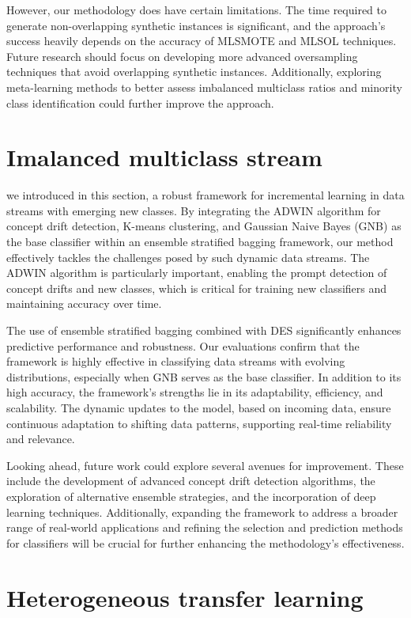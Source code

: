 However, our methodology does have certain limitations. The time required to generate non-overlapping synthetic instances is significant, and the approach's success heavily depends on the accuracy of MLSMOTE and MLSOL techniques. Future research should focus on developing more advanced oversampling techniques that avoid overlapping synthetic instances. Additionally, exploring meta-learning methods to better assess imbalanced multiclass ratios and minority class identification could further improve the approach.

\section{Imalanced multiclass stream}
\label{section:7_2}
we introduced in this section, a robust framework for incremental learning in data streams with emerging new classes. By integrating the ADWIN algorithm for concept drift detection, K-means clustering, and Gaussian Naive Bayes (GNB) as the base classifier within an ensemble stratified bagging framework, our method effectively tackles the challenges posed by such dynamic data streams. The ADWIN algorithm is particularly important, enabling the prompt detection of concept drifts and new classes, which is critical for training new classifiers and maintaining accuracy over time.

The use of ensemble stratified bagging combined with DES significantly enhances predictive performance and robustness. Our evaluations confirm that the framework is highly effective in classifying data streams with evolving distributions, especially when GNB serves as the base classifier. In addition to its high accuracy, the framework's strengths lie in its adaptability, efficiency, and scalability. The dynamic updates to the model, based on incoming data, ensure continuous adaptation to shifting data patterns, supporting real-time reliability and relevance.

Looking ahead, future work could explore several avenues for improvement. These include the development of advanced concept drift detection algorithms, the exploration of alternative ensemble strategies, and the incorporation of deep learning techniques. Additionally, expanding the framework to address a broader range of real-world applications and refining the selection and prediction methods for classifiers will be crucial for further enhancing the methodology's effectiveness.

\section{Heterogeneous transfer learning}
\label{section:7_2}

